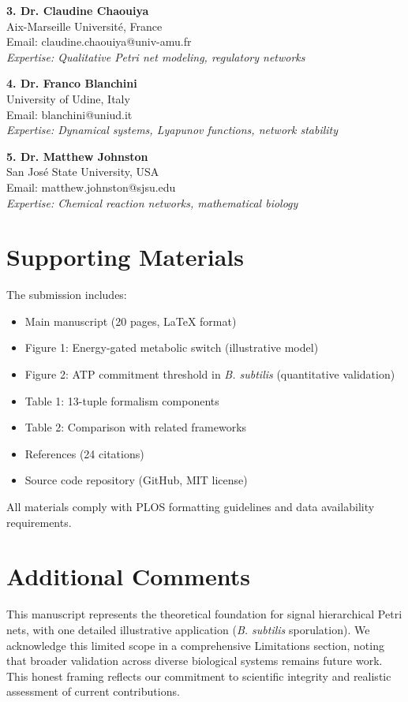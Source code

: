 \documentclass[11pt,letterpaper]{article}
\begin{document}
\textbf{3. Dr. Claudine Chaouiya}\\
Aix-Marseille Université, France\\
Email: claudine.chaouiya@univ-amu.fr\\
\textit{Expertise: Qualitative Petri net modeling, regulatory networks}

\textbf{4. Dr. Franco Blanchini}\\
University of Udine, Italy\\
Email: blanchini@uniud.it\\
\textit{Expertise: Dynamical systems, Lyapunov functions, network stability}

\textbf{5. Dr. Matthew Johnston}\\
San José State University, USA\\
Email: matthew.johnston@sjsu.edu\\
\textit{Expertise: Chemical reaction networks, mathematical biology}

\section*{Supporting Materials}

The submission includes:
\begin{itemize}
\item Main manuscript (20 pages, LaTeX format)
\item Figure 1: Energy-gated metabolic switch (illustrative model)
\item Figure 2: ATP commitment threshold in \textit{B. subtilis} (quantitative validation)
\item Table 1: 13-tuple formalism components
\item Table 2: Comparison with related frameworks
\item References (24 citations)
\item Source code repository (GitHub, MIT license)
\end{itemize}

All materials comply with PLOS formatting guidelines and data availability requirements.

\section*{Additional Comments}

This manuscript represents the theoretical foundation for signal hierarchical Petri nets, with one detailed illustrative application (\textit{B. subtilis} sporulation). We acknowledge this limited scope in a comprehensive Limitations section, noting that broader validation across diverse biological systems remains future work. This honest framing reflects our commitment to scientific integrity and realistic assessment of current contributions.
\end{document}

